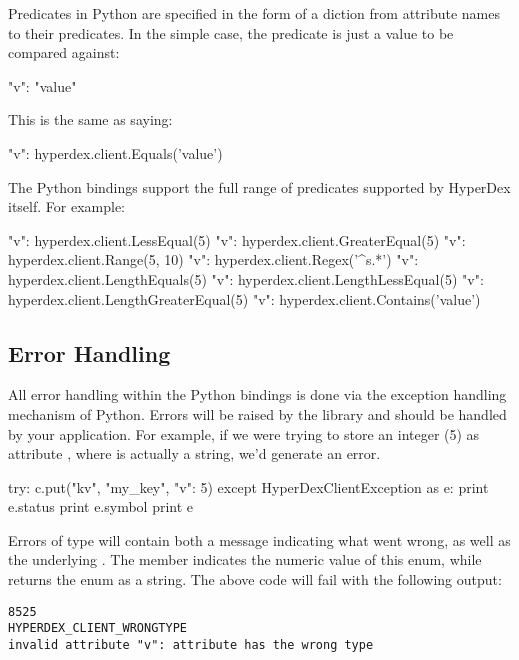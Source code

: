 Predicates in Python are specified in the form of a diction from attribute names to
their predicates.  In the simple case, the predicate is just a value to be
compared against:

\begin{pythoncode}
{"v": "value"}
\end{pythoncode}

This is the same as saying:

\begin{pythoncode}
{"v": hyperdex.client.Equals('value')}
\end{pythoncode}

The Python bindings support the full range of predicates supported by HyperDex
itself.  For example:

\begin{pythoncode}
{"v": hyperdex.client.LessEqual(5)}
{"v": hyperdex.client.GreaterEqual(5)}
{"v": hyperdex.client.Range(5, 10)}
{"v": hyperdex.client.Regex('^s.*')}
{"v": hyperdex.client.LengthEquals(5)}
{"v": hyperdex.client.LengthLessEqual(5)}
{"v": hyperdex.client.LengthGreaterEqual(5)}
{"v": hyperdex.client.Contains('value')}
\end{pythoncode}

\subsection{Error Handling}
\label{sec:api:python-client:error-handling}

All error handling within the Python bindings is done via the exception handling
mechanism of Python.  Errors will be raised by the library and should be handled
by your application.  For example, if we were trying to store an integer (5) as
attribute , where  is actually a string, we'd generate an error.

\begin{pythoncode}
try:
    c.put("kv", "my_key", {"v": 5})
except HyperDexClientException as e:
    print e.status
    print e.symbol
    print e
\end{pythoncode}

Errors of type  will contain both a message
indicating what went wrong, as well as the underlying .  The member  indicates the numeric
value of this enum, while  returns the enum as a string.  The above
code will fail with the following output:

\begin{verbatim}
8525
HYPERDEX_CLIENT_WRONGTYPE
invalid attribute "v": attribute has the wrong type
\end{verbatim}

